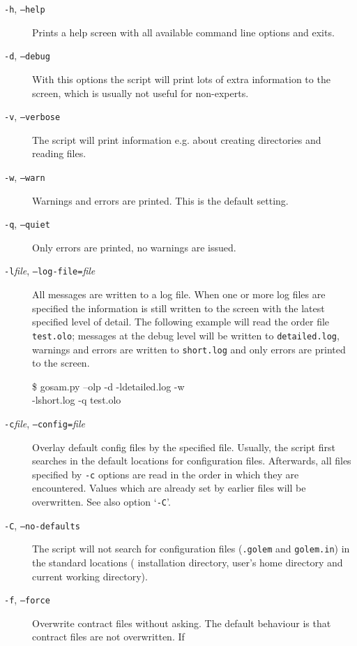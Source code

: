 \begin{description}
\item[\texttt{-h}, \texttt{--help}]
      Prints a help screen with all available command line options and exits.
\item[\texttt{-d}, \texttt{--debug}] 
      With this options the script will print lots of extra information to
      the screen, which is usually not useful for non-experts.
\item[\texttt{-v}, \texttt{--verbose}] 
      The script will print information e.g. about creating directories
      and reading files.
\item[\texttt{-w}, \texttt{--warn}]
      Warnings and errors are printed. This is the default setting.
\item[\texttt{-q}, \texttt{--quiet}]
      Only errors are printed, no warnings are issued.
\item[\texttt{-l}\textit{file}, \texttt{--log-file=}\textit{file}]
      All messages are written to a log file. When one or more log files
      are specified the information is still written to the screen with
      the latest specified level of detail. The following example will
      read the order file \texttt{test.olo}; messages at the debug
      level will be written to \texttt{detailed.log}, warnings and
      errors are written to \texttt{short.log} and only errors are printed
      to the screen.
      \begin{example}
\$ gosam.py --olp -d -ldetailed.log -w \\
	\contl{} -lshort.log -q test.olo
      \end{example}
\item[\texttt{-c}\textit{file}, \texttt{--config=}\textit{file}]
      Overlay default config files by the specified file.
      Usually, the script first searches in the default locations for
      configuration files. Afterwards, all files specified by \texttt{-c}
      options are read in the order in which they are encountered. Values
      which are already set by earlier files will be overwritten.
      See also option `\texttt{-C}'.
\item[\texttt{-C}, \texttt{--no-defaults}]
      The script will not search for configuration
      files (\texttt{.golem} and \texttt{golem.in}) in the standard locations
      (\gosamv{} installation directory, user's home directory and
      current working directory).
\item[\texttt{-f}, \texttt{--force}] Overwrite contract files without asking.
      The default behaviour is that contract files are not overwritten. If

\end{description}

